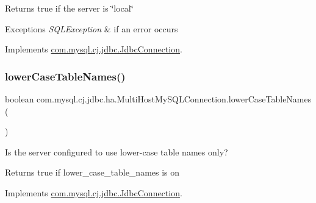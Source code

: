 \begin{DoxyReturn}{Returns}
true if the server is \char`\"{}local\char`\"{} 
\end{DoxyReturn}

\begin{DoxyExceptions}{Exceptions}
{\em S\+Q\+L\+Exception} & if an error occurs \\
\hline
\end{DoxyExceptions}


Implements \mbox{\hyperlink{interfacecom_1_1mysql_1_1cj_1_1jdbc_1_1_jdbc_connection_a4418f89cdbd768f892b6ef7823107921}{com.\+mysql.\+cj.\+jdbc.\+Jdbc\+Connection}}.

\mbox{\label{classcom_1_1mysql_1_1cj_1_1jdbc_1_1ha_1_1_multi_host_my_s_q_l_connection_a5a3250cfcbd628ed09ce0eb494a1ff20}} 
\subsubsection{\texorpdfstring{lower\+Case\+Table\+Names()}{lowerCaseTableNames()}}
{\footnotesize\ttfamily boolean com.\+mysql.\+cj.\+jdbc.\+ha.\+Multi\+Host\+My\+S\+Q\+L\+Connection.\+lower\+Case\+Table\+Names (\begin{DoxyParamCaption}{ }\end{DoxyParamCaption})}

Is the server configured to use lower-\/case table names only?

\begin{DoxyReturn}{Returns}
true if lower\+\_\+case\+\_\+table\+\_\+names is \textquotesingle{}on\textquotesingle{} 
\end{DoxyReturn}


Implements \mbox{\hyperlink{interfacecom_1_1mysql_1_1cj_1_1jdbc_1_1_jdbc_connection_a54cca6407a1a531b8e65ee3d965a51cd}{com.\+mysql.\+cj.\+jdbc.\+Jdbc\+Connection}}.

\mbox{\label{classcom_1_1mysql_1_1cj_1_1jdbc_1_1ha_1_1_multi_host_my_s_q_l_connection_a75f3a66c04a2960e920a6e57a3279556}} 
